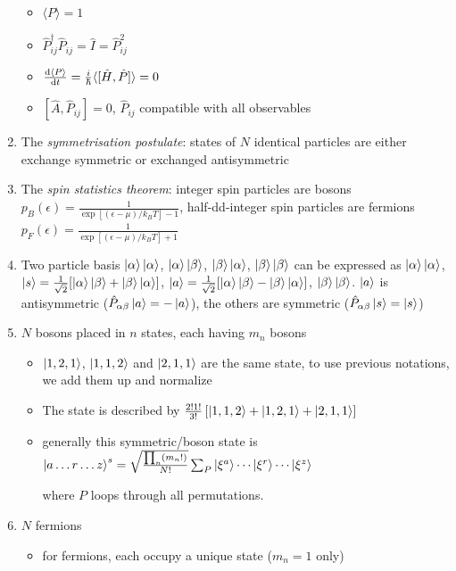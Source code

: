 \documentclass{article}
\theoremstyle{remark}
\theoremstyle{remark}
\newcommand{\where}[1]{\begin{flushright}where #1.\end{flushright}}
\begin{document}
\begin{enumerate}
\begin{itemize}
            \item $\langle P\rangle = 1$
            \item $\hat{P}^\dagger_{ij}\hat{P}_{ij}=\hat{I} = \hat{P}_{ij}^2$
            \item $\dv{\langle P\rangle}{t}=\frac{i}{\hbar}\langle[\hat{H},\hat{P}]\rangle = 0$
            \item $[\hat{A},\hat{P}_{ij}]=0$, $\hat{P}_{ij}$ compatible with all observables
        \end{itemize}
    \item The \emph{symmetrisation postulate}: states of $N$ identical particles are either exchange symmetric or exchanged antisymmetric
    \item The \emph{spin statistics theorem}: integer spin particles are bosons $p_B(\epsilon)=\frac{1}{\exp[(\epsilon-\mu)/k_B T]-1}$, half-dd-integer spin particles are fermions $p_F(\epsilon)=\frac{1}{\exp[(\epsilon-\mu)/k_B T]+1}$
    \item Two particle basis $\ket{\alpha}\ket{\alpha}$, $\ket{\alpha}\ket{\beta}$, $\ket{\beta}\ket{\alpha}$, $\ket{\beta}\ket{\beta}$ can be expressed as $\ket{\alpha}\ket{\alpha}$, $\ket{s}=\frac{1}{\sqrt{2}}[\ket{\alpha}\ket{\beta}+\ket{\beta}\ket{\alpha}]$,
     $\ket{a}=\frac{1}{\sqrt{2}}[\ket{\alpha}\ket{\beta}-\ket{\beta}\ket{\alpha}]$, $\ket{\beta}\ket{\beta}$.
     $\ket{a}$ is antisymmetric ($\hat{P}_{\alpha\beta}\ket{a}=-\ket{a}$), the others are symmetric ($\hat{P}_{\alpha\beta}\ket{s}=\ket{s}$)
    \item $N$ bosons placed in $n$ states, each having $m_n$ bosons\begin{itemize}
            \item $\ket{1,2,1}$, $\ket{1,1,2}$ and $\ket{2,1,1}$ are the same state, to use previous notations, we add them up and normalize
            \item The state is described by $\frac{2!1!}{3!}\left[\ket{1,1,2}+\ket{1,2,1}+\ket{2,1,1}\right]$
            \item generally this symmetric/boson state is \newline
                $\ket{a\ldots r\ldots z}^s=\sqrt{\frac{\prod_n(m_n!)}{N!}}\sum_P\ket{\xi^a}\cdots\ket{\xi^r}\cdots\ket{\xi^z}$
                \where{$P$ loops through all permutations}
        \end{itemize}
    \item $N$ fermions\begin{itemize}
        \item for fermions, each occupy a unique state ($m_n=1$ only)

\end{itemize}
\end{enumerate}
\end{document}
